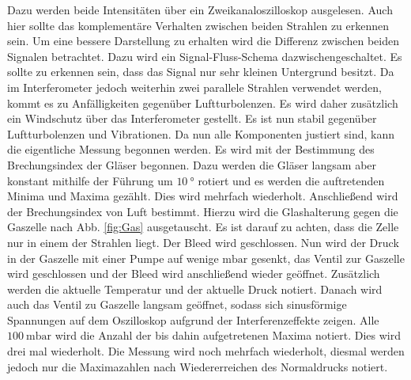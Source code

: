  Dazu werden beide Intensitäten über ein Zweikanaloszilloskop ausgelesen. Auch hier sollte das komplementäre Verhalten zwischen beiden Strahlen zu erkennen sein. Um eine bessere Darstellung zu erhalten wird die Differenz zwischen beiden Signalen betrachtet. Dazu wird ein Signal-Fluss-Schema dazwischengeschaltet. Es sollte zu erkennen sein, dass das Signal nur sehr kleinen Untergrund besitzt. Da im Interferometer jedoch weiterhin zwei parallele Strahlen verwendet werden, kommt es zu Anfälligkeiten gegenüber Luftturbolenzen. Es wird daher zusätzlich ein Windschutz über das Interferometer gestellt. Es ist nun stabil gegenüber Luftturbolenzen und Vibrationen. Da nun alle Komponenten justiert sind, kann die eigentliche Messung begonnen werden. Es wird mit der Bestimmung des Brechungsindex der Gläser begonnen. Dazu werden die Gläser langsam aber konstant mithilfe der Führung um $\SI{10}{\degree}$ rotiert und es werden die auftretenden Minima und Maxima gezählt. Dies wird mehrfach wiederholt. Anschließend wird der Brechungsindex von Luft bestimmt. Hierzu wird die Glashalterung gegen die Gaszelle  nach Abb. \ref{fig:Gas} ausgetauscht. Es ist darauf zu achten, dass die Zelle nur in einem der Strahlen liegt. Der Bleed wird geschlossen. Nun wird der Druck in der Gaszelle mit einer Pumpe auf wenige $\si{\milli\bar}$ gesenkt, das Ventil zur Gaszelle wird geschlossen und der Bleed wird anschließend wieder geöffnet. Zusätzlich werden die aktuelle Temperatur und der aktuelle Druck notiert. Danach wird auch das Ventil zu Gaszelle langsam geöffnet, sodass sich sinusförmige Spannungen auf dem Oszilloskop aufgrund der Interferenzeffekte zeigen. Alle $\SI{100}{\milli\bar}$ wird die Anzahl der bis dahin aufgetretenen Maxima notiert. Dies wird drei mal wiederholt. Die Messung wird noch mehrfach wiederholt, diesmal werden jedoch nur die Maximazahlen nach Wiedererreichen des Normaldrucks notiert. 